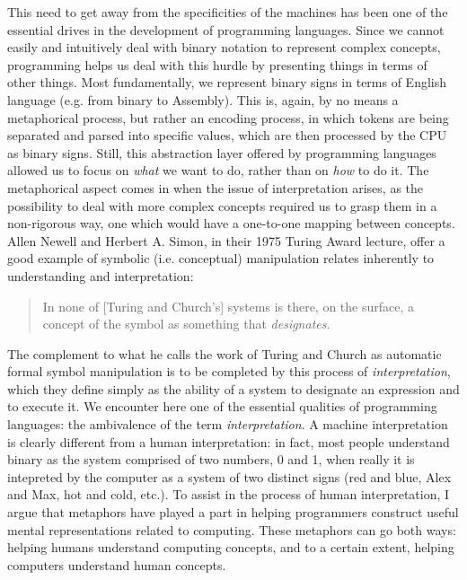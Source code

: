 \documentclass{article}
\begin{document}
This need to get away from the specificities of the machines has been one of the essential drives in the development of programming languages. Since we cannot easily and intuitively deal with binary notation to represent complex concepts, programming helps us deal with this hurdle by presenting things in terms of other things. Most fundamentally, we represent binary signs in terms of English language (e.g. from binary to Assembly). This is, again, by no means a metaphorical process, but rather an encoding process, in which tokens are being separated and parsed into specific values, which are then processed by the CPU as binary signs. Still, this abstraction layer offered by programming languages allowed us to focus on \emph{what} we want to do, rather than on \emph{how} to do it. The metaphorical aspect comes in when the issue of interpretation arises, as the possibility to deal with more complex concepts required us to grasp them in a non-rigorous way, one which would have a one-to-one mapping between concepts. Allen Newell and Herbert A. Simon, in their 1975 Turing Award lecture, offer a good example of symbolic (i.e. conceptual) manipulation relates inherently to understanding and interpretation:

\begin{quote}
  In none of [Turing and Church's] systems is there, on the surface, a concept of the symbol as something that \emph{designates}.
\end{quote}

The complement to what he calls the work of Turing and Church as automatic formal symbol manipulation is to be completed by this process of \emph{interpretation}, which they define simply as the ability of a system to designate an expression and to execute it. We encounter here one of the essential qualities of programming languages: the ambivalence of the term \emph{interpretation}. A machine interpretation is clearly different from a human interpretation: in fact, most people understand binary as the system comprised of two numbers, 0 and 1, when really it is intepreted by the computer as a system of two distinct signs (red and blue, Alex and Max, hot and cold, etc.). To assist in the process of human interpretation, I argue that metaphors have played a part in helping programmers construct useful mental representations related to computing. These metaphors can go both ways: helping humans understand computing concepts, and to a certain extent, helping computers understand human concepts.
\end{document}
